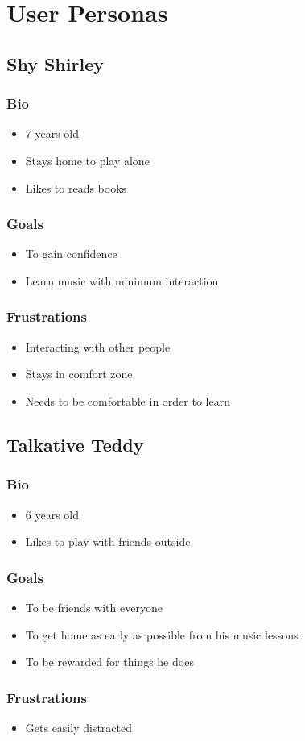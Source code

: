 \chapter{User Personas}
\label{sec:appendixd}

\section{Shy Shirley}
\subsection{Bio}
\begin{itemize}
    \item 7 years old
    \item Stays home to play alone
    \item Likes to reads books
\end{itemize}

\subsection{Goals}
\begin{itemize}
    \item To gain confidence
    \item Learn music with minimum interaction
\end{itemize}

\subsection{Frustrations}
\begin{itemize}
    \item Interacting with other people
    \item Stays in comfort zone
    \item Needs to be comfortable in order to learn
\end{itemize}

\section{Talkative Teddy}
\subsection{Bio}
\begin{itemize}
    \item 6 years old
    \item Likes to play with friends outside
\end{itemize}

\subsection{Goals}
\begin{itemize}
    \item To be friends with everyone
    \item To get home as early as possible from his music lessons
    \item To be rewarded for things he does
\end{itemize}

\subsection{Frustrations}
\begin{itemize}
    \item Gets easily distracted
\end{itemize}